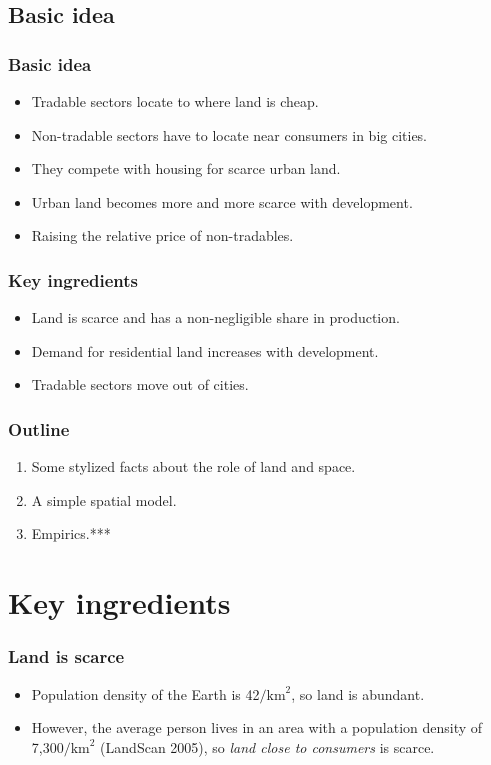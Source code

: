 \documentclass[handout,compress,mathserif]{beamer}
\begin{document}


\subsection{Basic idea}
\begin{frame}\frametitle{Basic idea}
\begin{itemize}
    \item Tradable sectors locate to where land is cheap.
    \item Non-tradable sectors have to locate near consumers in big cities.
    \item They compete with housing for scarce urban land.
    \item Urban land becomes more and more scarce with development.
    \item Raising the relative price of non-tradables.
\end{itemize}
\end{frame}

\begin{frame}\frametitle{Key ingredients}
\begin{itemize}
    \item Land is scarce and has a non-negligible share in production.
    \item Demand for residential land increases with development.
    \item Tradable sectors move out of cities.
\end{itemize}
\end{frame}


\begin{frame}\frametitle{Outline}
\begin{enumerate}
    \item Some stylized facts about the role of land and space.
    \item A simple spatial model.
    \item Empirics.***
\end{enumerate}
\end{frame}


\section{Key ingredients}
\begin{frame}\frametitle{Land is scarce}
\begin{itemize}
    \item Population density of the Earth is 42$/\text{km}^2$, so land is abundant.
    \pause
    \item However, the average person lives in an area with a population density of 7,300$/\text{km}^2$ (LandScan 2005),
    so \emph{land close to consumers} is scarce.
\end{itemize}
\end{frame}
\end{document}
